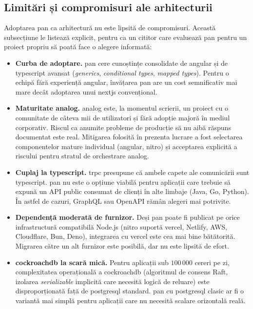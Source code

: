 \subsection{Limitări și compromisuri ale arhitecturii}\label{subsec:pan-limitari}

Adoptarea \gls{pan} ca arhitectură nu este lipsită de compromisuri.
Această subsecțiune le listează explicit, pentru ca un cititor care evaluează \gls{pan} pentru un proiect propriu să poată face o alegere informată:

\begin{itemize}
  \item \textbf{Curba de adoptare.} \gls{pan} cere cunoștințe consolidate de \gls{angular} și de \gls{typescript} avansat (\textit{generics}, \textit{conditional types}, \textit{mapped types}). Pentru o echipă fără experiență \gls{angular}, învățarea \gls{pan} are un cost semnificativ mai mare decât adoptarea unui \gls{nextjs} convențional.

  \item \textbf{Maturitate \gls{analog}.} \gls{analog} este, la momentul scrierii, un proiect cu o comunitate de câteva mii de utilizatori și fără adopție majoră în mediul corporativ. Riscul ca anumite probleme de producție să nu aibă răspuns documentat este real. Mitigarea folosită în prezenta lucrare a fost selectarea componentelor mature individual (\gls{angular}, \gls{nitro}) și acceptarea explicită a riscului pentru stratul de orchestrare \gls{analog}.

  \item \textbf{Cuplaj la \gls{typescript}.} \gls{trpc} presupune că ambele capete ale comunicării sunt \gls{typescript}. \gls{pan} nu este o opțiune viabilă pentru aplicații care trebuie să expună un API public consumat de clienți în alte limbaje (Java, Go, Python). În astfel de cazuri, GraphQL sau OpenAPI rămân alegeri mai potrivite.

  \item \textbf{Dependență moderată de furnizor.} Deși \gls{pan} poate fi publicat pe orice infrastructură compatibilă Node.js (\gls{nitro} suportă \gls{vercel}, Netlify, AWS, Cloudflare, Bun, Deno), integrarea cu \gls{vercel} este cea mai bine bătătorită. Migrarea către un alt furnizor este posibilă, dar nu este lipsită de efort.

  \item \textbf{\gls{cockroachdb} la scară mică.} Pentru aplicații sub \(100\,000\) cereri pe zi, complexitatea operațională a \gls{cockroachdb} (algoritmul de consens Raft, izolarea \textit{serializable} implicită care necesită logică de reluare) este disproporționată față de \gls{postgresql} standard. \gls{pan} cu \gls{postgresql} clasic ar fi o variantă mai simplă pentru aplicații care nu necesită scalare orizontală reală.


\end{itemize}
